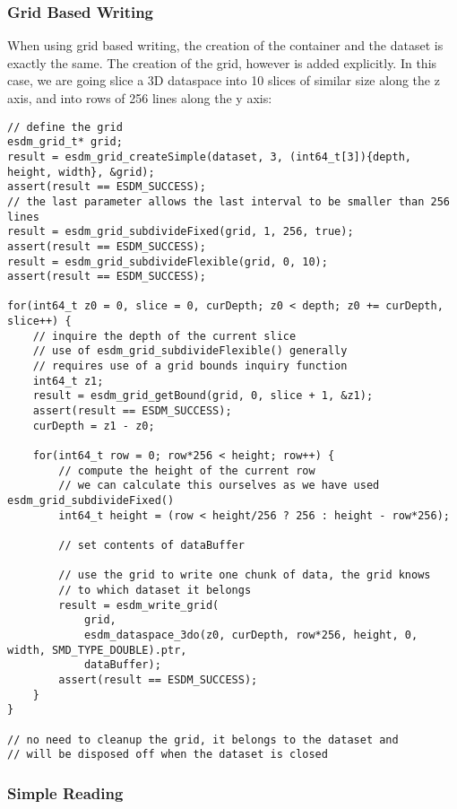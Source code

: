 \subsubsection{Grid Based Writing}

When using grid based writing, the creation of the container and the
dataset is exactly the same. The creation of the grid, however is added
explicitly. In this case, we are going slice a 3D dataspace into 10
slices of similar size along the z axis, and into rows of 256 lines
along the y axis:

\begin{lstlisting}
// define the grid
esdm_grid_t* grid;
result = esdm_grid_createSimple(dataset, 3, (int64_t[3]){depth, height, width}, &grid);
assert(result == ESDM_SUCCESS);
// the last parameter allows the last interval to be smaller than 256 lines
result = esdm_grid_subdivideFixed(grid, 1, 256, true);  
assert(result == ESDM_SUCCESS);
result = esdm_grid_subdivideFlexible(grid, 0, 10);
assert(result == ESDM_SUCCESS);

for(int64_t z0 = 0, slice = 0, curDepth; z0 < depth; z0 += curDepth, slice++) {
    // inquire the depth of the current slice
    // use of esdm_grid_subdivideFlexible() generally 
    // requires use of a grid bounds inquiry function
    int64_t z1;
    result = esdm_grid_getBound(grid, 0, slice + 1, &z1);
    assert(result == ESDM_SUCCESS);
    curDepth = z1 - z0;

    for(int64_t row = 0; row*256 < height; row++) {
        // compute the height of the current row
        // we can calculate this ourselves as we have used esdm_grid_subdivideFixed()
        int64_t height = (row < height/256 ? 256 : height - row*256);

        // set contents of dataBuffer

        // use the grid to write one chunk of data, the grid knows 
        // to which dataset it belongs
        result = esdm_write_grid(
            grid, 
            esdm_dataspace_3do(z0, curDepth, row*256, height, 0, width, SMD_TYPE_DOUBLE).ptr, 
            dataBuffer);
        assert(result == ESDM_SUCCESS);
    }
}

// no need to cleanup the grid, it belongs to the dataset and 
// will be disposed off when the dataset is closed
\end{lstlisting}

\subsubsection{Simple Reading}

